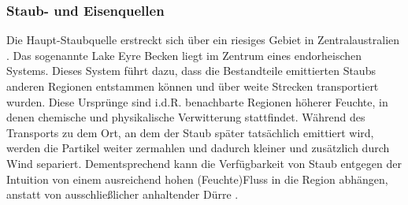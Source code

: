 \documentclass[12pt,a4paper,onecolumn,headheight=30pt]{scrartcl}
\begin{document}
\subsubsection{Staub- und Eisenquellen} \label{sec:staubquellen}
Die Haupt-Staubquelle erstreckt sich über ein riesiges Gebiet in Zentralaustralien \citep{Shao.2011}. Das sogenannte Lake Eyre Becken liegt im Zentrum eines endorheischen Systems. Dieses System führt dazu, dass die Bestandteile emittierten Staubs anderen Regionen entstammen können und über weite Strecken transportiert wurden. Diese Ursprünge sind i.d.R. benachbarte Regionen höherer Feuchte, in denen chemische und physikalische Verwitterung stattfindet. Während des Transports zu dem Ort, an dem der Staub später tatsächlich emittiert wird, werden die Partikel weiter zermahlen und dadurch kleiner und zusätzlich durch Wind separiert. Dementsprechend kann die Verfügbarkeit von Staub entgegen der Intuition von einem ausreichend hohen (Feuchte)Fluss in die Region abhängen, anstatt von ausschließlicher anhaltender Dürre \citep{Marx.2018}.
\end{document}
